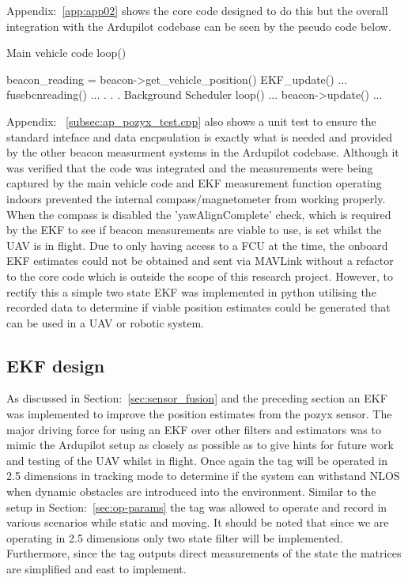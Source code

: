 Appendix:~\ref{app:app02} shows the core code designed to do this but the overall integration with the Ardupilot codebase can be seen by the pseudo code below.
\begin{algorithm}
    Main vehicle code
        loop()
        {
            beacon_reading = beacon->get_vehicle_position()
            EKF_update()
            {
                ...
                fusebcnreading()
                ...
            }
            .
            .
            .
    Background Scheduler
        loop()
        {
            ...
            beacon->update()
            ...
        }

        }
\end{algorithm}

Appendix: ~\ref{subsec:ap_pozyx_test.cpp} also shows a unit test to ensure the standard inteface and data encpsulation is exactly what is needed and provided by the other beacon measurment systems in the Ardupilot codebase.
Although it was verified that the code was integrated and the measurements were being captured by the main vehicle code and EKF measurement function operating indoors prevented the internal compass/magnetometer from working properly.
When the compass is disabled the 'yawAlignComplete' check, which is required by the EKF to see if beacon measurements are viable to use, is set whilst the UAV is in flight.
Due to only having access to a FCU at the time, the onboard EKF estimates could not be obtained and sent via MAVLink without a refactor to the core code which is outside the scope of this research project.
However, to rectify this a simple two state EKF was implemented in python utilising the recorded data to determine if viable position estimates could be generated that can be used in a UAV or robotic system.

\subsection*{EKF design}
As discussed in Section:~\ref{sec:sensor_fusion} and the preceding section an EKF was implemented to improve the position estimates from the pozyx sensor.
The major driving force for using an EKF over other filters and estimators was to mimic the Ardupilot setup as closely as possible as to give hints for future work and testing of the UAV whilst in flight.
Once again the tag will be operated in 2.5 dimensions in tracking mode to determine if the system can withstand NLOS when dynamic obstacles are introduced into the environment.
Similar to the setup in Section:~\ref{sec:op-params} the tag was allowed to operate and record in various scenarios while static and moving.
It should be noted that since we are operating in 2.5 dimensions only two state filter will be implemented.
Furthermore, since the tag outputs direct measurements of the state the matrices are simplified and east to implement.

